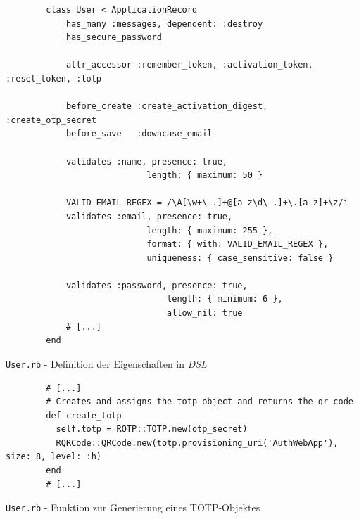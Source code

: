 \documentclass[11pt,a4paper,ngerman]{scrreprt}
\begin{document}
\begin{listing}[htpb]
    \begin{verbatim}
        class User < ApplicationRecord
            has_many :messages, dependent: :destroy
            has_secure_password
        
            attr_accessor :remember_token, :activation_token, :reset_token, :totp
        
            before_create :create_activation_digest, :create_otp_secret
            before_save   :downcase_email
        
            validates :name, presence: true,
                            length: { maximum: 50 }
        
            VALID_EMAIL_REGEX = /\A[\w+\-.]+@[a-z\d\-.]+\.[a-z]+\z/i
            validates :email, presence: true,
                            length: { maximum: 255 },
                            format: { with: VALID_EMAIL_REGEX },
                            uniqueness: { case_sensitive: false }
        
            validates :password, presence: true,
                                length: { minimum: 6 },
                                allow_nil: true
            # [...]
        end
    \end{verbatim}
    \caption{\texttt{User.rb} - Definition der Eigenschaften in \textit{DSL}}
    \label{lst:User.rb-dsl}
\end{listing}
\begin{listing}[htpb]
    \begin{verbatim}
        # [...]
        # Creates and assigns the totp object and returns the qr code
        def create_totp
          self.totp = ROTP::TOTP.new(otp_secret)
          RQRCode::QRCode.new(totp.provisioning_uri('AuthWebApp'), size: 8, level: :h)
        end
        # [...]
    \end{verbatim}
    \caption{\texttt{User.rb} - Funktion zur Generierung eines TOTP-Objektes}
    \label{lst:User.rb-createTOTP}
\end{listing}
\end{document}
